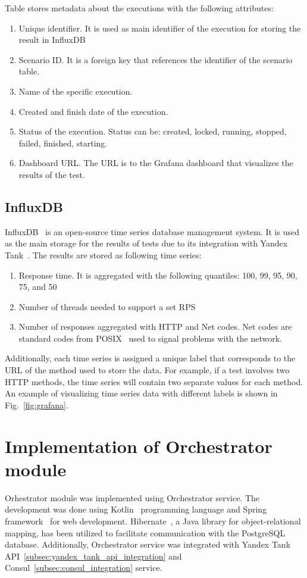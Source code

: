 Table  stores metadata about the executions with the following attributes:
\begin{enumerate}
    \item Unique identifier. It is used as main identifier of the execution for storing the result in InfluxDB
    \item Scenario ID. It is a foreign key that references the identifier of the scenario table.
    \item Name of the specific execution.
    \item Created and finish date of the execution.
    \item Status of the execution. Status can be: created, locked, running,  stopped,  failed, finished, starting.
    \item Dashboard URL. The URL is to the Grafana dashboard that visualizes the results of the test.
\end{enumerate}

\subsection{InfluxDB}\label{subsec:influxdb}
InfluxDB~\cite{influxdb} is an open-source time series database management system.
It is used as the main storage for the results of tests due to its integration with Yandex Tank~\cite{yandex_tank}. The results are stored as following time series:
\begin{enumerate}
    \item Response time. It is aggregated with the following quantiles: 100, 99, 95, 90, 75, and 50
    \item Number of threads needed to support a set RPS
    \item Number of responses aggregated with HTTP and Net codes. Net codes are standard codes from POSIX~\cite{posix_errors} used to signal problems with the network.
\end{enumerate}
Additionally, each time series is assigned a unique label that corresponds to the URL of the method used to store the data. For example, if a test involves two HTTP methods, the time series will contain two separate values for each method.
An example of visualizing time series data with different labels is shown in Fig.~\ref{fig:grafana}.


\section{Implementation of Orchestrator module}\label{sec:ochestrator_impl}
Orhestrator module was implemented using Orchestrator service. The development was done using Kotlin~\cite{kotlin} programming language and Spring framework~\cite{spring} for web development.
Hibernate~\cite{hibernate}, a Java library for object-relational mapping, has been utilized to facilitate communication with the PostgreSQL database.
Additionally, Orchestrator service was integrated with Yandex Tank API~\ref{subsec:yandex_tank_api_integration} and Consul~\ref{subsec:consul_integration} service.

